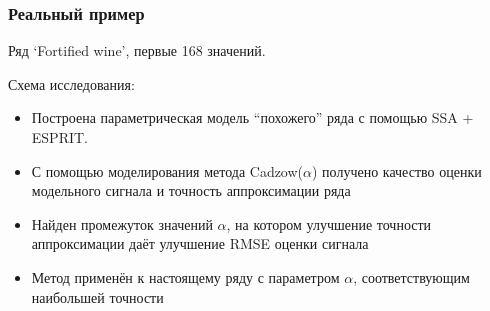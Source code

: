 \documentclass[unicode, notheorems]{beamer}
\begin{document}
	

\begin{frame}
	\frametitle{Реальный пример}
    Ряд `Fortified wine', первые 168 значений.
    
    Схема исследования:
    \begin{itemize}
    	\item Построена параметрическая модель ``похожего'' ряда с помощью SSA + ESPRIT.
    	\item С помощью моделирования метода Cadzow($\alpha$) получено качество оценки модельного сигнала и точность аппроксимации ряда
    	\item Найден промежуток значений $\alpha$, на котором улучшение точности аппроксимации даёт улучшение RMSE оценки сигнала
    	\item Метод применён к настоящему ряду с параметром $\alpha$, соответствующим наибольшей точности
    \end{itemize}
\end{frame}

%	
\end{document}
